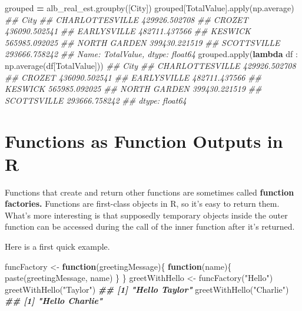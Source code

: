 \documentclass[
  12pt,
  krantz2]{krantz}
\makeatletter
\newenvironment{Shaded}{\begin{snugshade}}{\end{snugshade}}
\newcommand{\BuiltInTok}[1]{#1}
\newcommand{\CommentTok}[1]{\textcolor[rgb]{0.37,0.37,0.37}{\textit{#1}}}
\newcommand{\ControlFlowTok}[1]{\textcolor[rgb]{0.27,0.27,0.27}{\textbf{#1}}}
\newcommand{\DocumentationTok}[1]{\textcolor[rgb]{0.37,0.37,0.37}{\textbf{\textit{#1}}}}
\newcommand{\FunctionTok}[1]{\textcolor[rgb]{0,0,0}{#1}}
\newcommand{\KeywordTok}[1]{\textcolor[rgb]{0.27,0.27,0.27}{\textbf{#1}}}
\newcommand{\NormalTok}[1]{#1}
\newcommand{\OperatorTok}[1]{\textcolor[rgb]{0.43,0.43,0.43}{\textbf{#1}}}
\newcommand{\OtherTok}[1]{\textcolor[rgb]{0.37,0.37,0.37}{#1}}
\newcommand{\StringTok}[1]{\textcolor[rgb]{0.5,0.5,0.5}{#1}}
\newenvironment{kframe}{%
\medskip{}
\setlength{\fboxsep}{.8em}
 \def\at@end@of@kframe{}%
 \ifinner\ifhmode%
  \def\at@end@of@kframe{\end{minipage}}%
  \begin{minipage}{\columnwidth}%
 \fi\fi%
 \def\FrameCommand##1{\hskip\@totalleftmargin \hskip-\fboxsep
 \colorbox{shadecolor}{##1}\hskip-\fboxsep
     \hskip-\linewidth \hskip-\@totalleftmargin \hskip\columnwidth}%
 \MakeFramed {\advance\hsize-\width
   \@totalleftmargin\z@ \linewidth\hsize
   \@setminipage}}%
 {\par\unskip\endMakeFramed%
 \at@end@of@kframe}
\renewenvironment{Shaded}{\begin{kframe}}{\end{kframe}}
\makeatother
\begin{document}
\begin{Shaded}
\begin{Highlighting}[]
\NormalTok{grouped }\OperatorTok{=}\NormalTok{ alb\_real\_est.groupby([}\StringTok{\textquotesingle{}City\textquotesingle{}}\NormalTok{])}
\NormalTok{grouped[}\StringTok{\textquotesingle{}TotalValue\textquotesingle{}}\NormalTok{].}\BuiltInTok{apply}\NormalTok{(np.average)}
\CommentTok{\#\# City}
\CommentTok{\#\# CHARLOTTESVILLE    429926.502708}
\CommentTok{\#\# CROZET             436090.502541}
\CommentTok{\#\# EARLYSVILLE        482711.437566}
\CommentTok{\#\# KESWICK            565985.092025}
\CommentTok{\#\# NORTH GARDEN       399430.221519}
\CommentTok{\#\# SCOTTSVILLE        293666.758242}
\CommentTok{\#\# Name: TotalValue, dtype: float64}
\NormalTok{grouped.}\BuiltInTok{apply}\NormalTok{(}\KeywordTok{lambda}\NormalTok{ df : np.average(df[}\StringTok{\textquotesingle{}TotalValue\textquotesingle{}}\NormalTok{]))}
\CommentTok{\#\# City}
\CommentTok{\#\# CHARLOTTESVILLE    429926.502708}
\CommentTok{\#\# CROZET             436090.502541}
\CommentTok{\#\# EARLYSVILLE        482711.437566}
\CommentTok{\#\# KESWICK            565985.092025}
\CommentTok{\#\# NORTH GARDEN       399430.221519}
\CommentTok{\#\# SCOTTSVILLE        293666.758242}
\CommentTok{\#\# dtype: float64}
\end{Highlighting}
\end{Shaded}

\hypertarget{functions-as-function-outputs-in-r}{%
\section{Functions as Function Outputs in R}\label{functions-as-function-outputs-in-r}}

Functions that create and return other functions are sometimes called \textbf{function factories.} Functions are first-class objects in R, so it's easy to return them. What's more interesting is that supposedly temporary objects inside the outer function can be accessed during the call of the inner function after it's returned.

Here is a first quick example.

\begin{Shaded}
\begin{Highlighting}[]
\NormalTok{funcFactory }\OtherTok{\textless{}{-}} \ControlFlowTok{function}\NormalTok{(greetingMessage)\{}
  \ControlFlowTok{function}\NormalTok{(name)\{}
    \FunctionTok{paste}\NormalTok{(greetingMessage, name)}
\NormalTok{  \}}
\NormalTok{\}}
\NormalTok{greetWithHello }\OtherTok{\textless{}{-}} \FunctionTok{funcFactory}\NormalTok{(}\StringTok{"Hello"}\NormalTok{)}
\FunctionTok{greetWithHello}\NormalTok{(}\StringTok{"Taylor"}\NormalTok{)}
\DocumentationTok{\#\# [1] "Hello Taylor"}
\FunctionTok{greetWithHello}\NormalTok{(}\StringTok{"Charlie"}\NormalTok{)}
\DocumentationTok{\#\# [1] "Hello Charlie"}
\end{Highlighting}
\end{Shaded}
\end{document}
